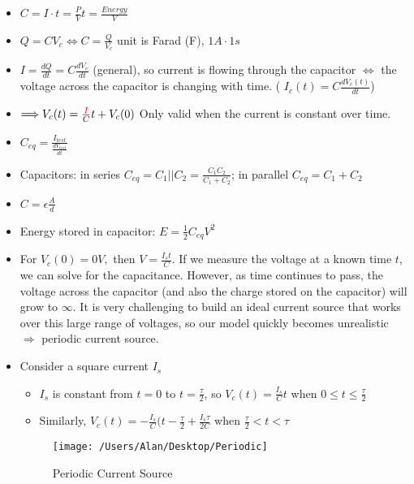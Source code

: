 \documentclass{article}
\begin{document}
\begin{itemize}
	\item $C = I\cdot t = \frac{P}{V}t = \frac{Energy}{V}$
	\item $Q = CV_c\iff C = \frac{Q}{V_c}$ unit is Farad (F), $1A\cdot 1s$
	\item $I = \frac{dQ}{dt} = C\frac{dV_c}{dt}$ (general), so current is flowing through the capacitor $\iff$ the voltage across the capacitor is changing with time. ({\color{red} $I_c(t) = C\frac{dV_c(t)}{dt}$})
	\item $\Longrightarrow V_c(t) = \frac{{\color{red} I}}{C}t + V_c(0)$ Only valid when the current is constant over time.
	\item $C_{eq} = \frac{I_{test}}{\frac{dV_{test}}{dt}}$
	\item Capacitors: {\color{red} in series} $C_{eq} = C_1||C_2 = \frac{C_1C_2}{C_1+C_2}$; in parallel $C_{eq} = C_1+C_2$
	\item {\color{red} $C = \epsilon\frac{A}{d}$}
	\item Energy stored in capacitor: $E = \frac{1}{2} C_{eq}V^2$
	\item For $V_c(0) = 0V,$ then $V = \frac{I_st}{C}$.	If we measure the voltage at a known time $t$, we can solve for the capacitance. However, as time continues to pass, the voltage across the capacitor (and also the charge stored on the capacitor) will grow to $\infty$. It is very challenging to build an ideal current source that works over this large range of voltages, so our model quickly becomes unrealistic $\Longrightarrow$ periodic current source.
	\item Consider a square current $I_s$
	\begin{itemize}
		\item $I_s$ is constant from $t=0$ to $t = \frac{\tau}{2}$, so $V_c(t) = \frac{I_s}{C}t$ when $0\leq t\leq\frac{\tau}{2}$
		\item Similarly, $V_c(t) = -\frac{I_s}{C}(t-\frac{\tau}{2} + \frac{I_s\tau}{2C}$ when $\frac{\tau}{2}<t<\tau$
	\end{itemize}

\begin{figure} [h!]
	\begin{center}
	\texttt{[image: /Users/Alan/Desktop/Periodic]}
	\caption{Periodic Current Source}
	\label{fig}
	\end{center}
\end{figure}

\end{itemize}
\end{document}
